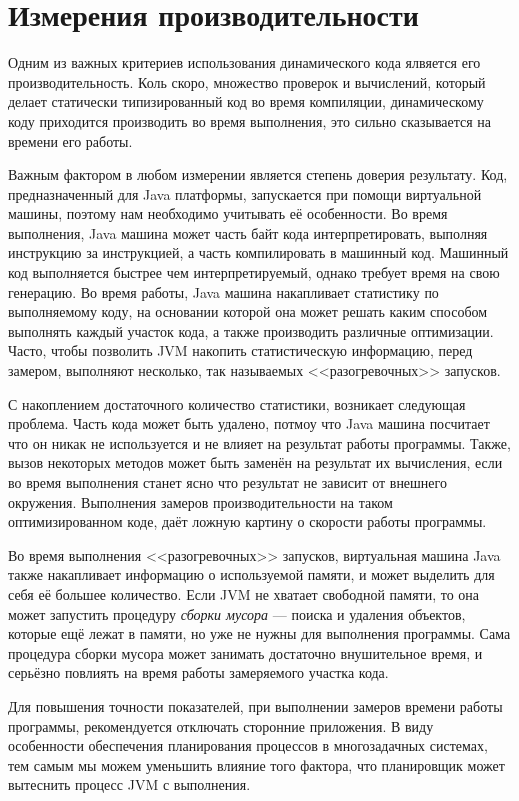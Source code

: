 \section{Измерения производительности}

Одним из важных критериев использования динамического кода ялвяется его производительность. Коль скоро, множество проверок и вычислений, который делает статически типизированный код во время компиляции, динамическому коду приходится производить во время выполнения, это сильно сказывается на времени его работы.

Важным фактором в любом измерении является степень доверия результату. Код, предназначенный для Java платформы, запускается при помощи виртуальной машины, поэтому нам необходимо учитывать её особенности. Во время выполнения, Java машина может часть байт кода интерпретировать, выполняя инструкцию за инструкцией, а часть  компилировать в машинный код. Машинный код выполняется быстрее чем интерпретируемый, однако требует время на свою генерацию. Во время работы, Java машина накапливает статистику по выполняемому коду, на основании которой она может решать каким способом выполнять каждый участок кода, а также производить различные оптимизации. Часто, чтобы позволить JVM накопить статистическую информацию, перед замером, выполняют несколько, так называемых <<разогревочных>> запусков.

С накоплением достаточного количество статистики, возникает следующая проблема. Часть кода может быть удалено, потмоу что Java машина посчитает что он никак не используется и не влияет на результат работы программы. Также, вызов некоторых методов может быть заменён на результат их вычисления, если во время выполнения станет ясно что результат не зависит от внешнего окружения. Выполнения замеров производительности на таком оптимизированном коде, даёт ложную картину о скорости работы программы.

Во время выполнения <<разогревочных>> запусков, виртуальная машина Java также накапливает информацию о используемой памяти, и может выделить для себя её большее количество. Если JVM не хватает свободной памяти, то она может запустить процедуру \textit{сборки мусора} --- поиска и удаления объектов, которые ещё лежат в памяти, но уже не нужны для выполнения программы. Сама процедура сборки мусора может занимать достаточно внушительное время, и серьёзно повлиять на время работы замеряемого участка кода.

Для повышения точности показателей, при выполнении замеров времени работы программы, рекомендуется отключать сторонние приложения. В виду особенности обеспечения планирования процессов в многозадачных системах, тем самым мы можем уменьшить влияние того фактора, что планировщик может вытеснить процесс JVM с выполнения.

